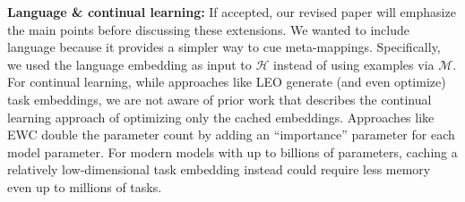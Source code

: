 \documentclass{article}
\begin{document}
\vspace{-0.1em}
\textbf{Language \& continual learning:} If accepted, our revised paper will emphasize the main points before discussing these extensions. We wanted to include language because it provides a simpler way to cue meta-mappings. Specifically, we used the language embedding as input to $\mathcal{H}$ instead of using examples via $\mathcal{M}$. For continual learning, while approaches like LEO generate (and even optimize) task embeddings, we are not aware of prior work that describes the continual learning approach of optimizing only the cached embeddings. Approaches like EWC double the parameter count by adding an ``importance'' parameter for each model parameter. For modern models with up to billions of parameters, caching a relatively low-dimensional task embedding instead could require less memory even up to millions of tasks. 
\end{document}
